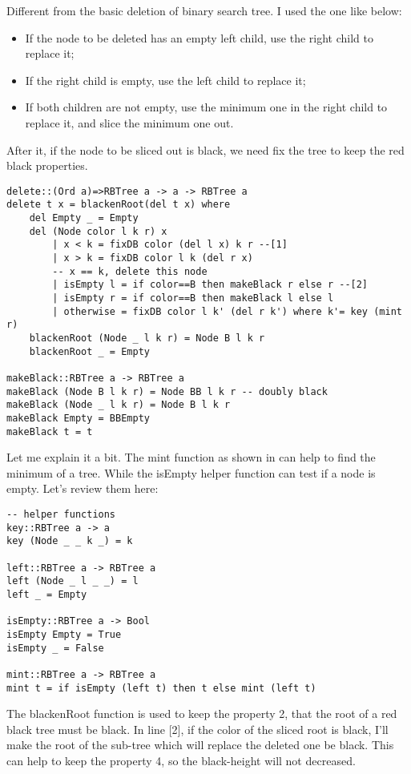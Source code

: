 \documentclass{article}
\begin{document}
Different from the basic deletion of binary search tree. I used the one like below:
\begin{itemize}
\item If the node to be deleted has an empty left child, use the right child to replace it;
\item If the right child is empty, use the left child to replace it;
\item If both children are not empty, use the minimum one in the right child to replace it, and
slice the minimum one out.
\end{itemize}

After it, if the node to be sliced out is black, we need fix the tree to keep the red black
properties.

\begin{lstlisting}
delete::(Ord a)=>RBTree a -> a -> RBTree a
delete t x = blackenRoot(del t x) where
    del Empty _ = Empty
    del (Node color l k r) x 
        | x < k = fixDB color (del l x) k r --[1]
        | x > k = fixDB color l k (del r x)
        -- x == k, delete this node
        | isEmpty l = if color==B then makeBlack r else r --[2]
        | isEmpty r = if color==B then makeBlack l else l
        | otherwise = fixDB color l k' (del r k') where k'= key (mint r)
    blackenRoot (Node _ l k r) = Node B l k r
    blackenRoot _ = Empty

makeBlack::RBTree a -> RBTree a
makeBlack (Node B l k r) = Node BB l k r -- doubly black
makeBlack (Node _ l k r) = Node B l k r
makeBlack Empty = BBEmpty
makeBlack t = t
\end{lstlisting}

Let me explain it a bit. The mint function as shown in \cite{bst-lxy} can help to find the 
minimum of a tree. While the isEmpty helper function can test if a node is empty. Let's review 
them here:

\begin{lstlisting}
-- helper functions
key::RBTree a -> a
key (Node _ _ k _) = k

left::RBTree a -> RBTree a
left (Node _ l _ _) = l
left _ = Empty

isEmpty::RBTree a -> Bool
isEmpty Empty = True
isEmpty _ = False

mint::RBTree a -> RBTree a
mint t = if isEmpty (left t) then t else mint (left t)
\end{lstlisting}

The blackenRoot function is used to keep the property 2, that the root of a red black tree
must be black. In line [2], if the color of the sliced root is black, I'll make the root 
of the sub-tree which will replace the deleted one be black. This can help to keep the property
4, so the black-height will not decreased.
\end{document}
